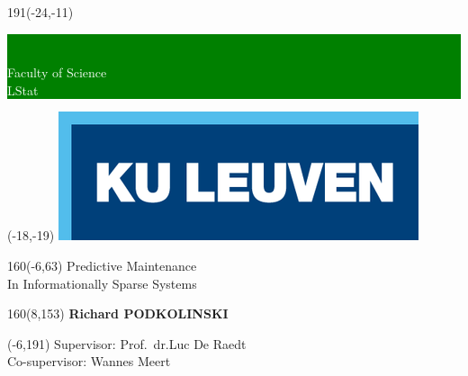 \documentclass[12pt,a4paper,oneside]{book}
\begin{document}
\thispagestyle{empty}
\newcommand{\form}[1]{\scalebox{1.087}{\boldmath{#1}}}
\sffamily
%
\begin{textblock}{191}(-24,-11)
\colorbox{green}{\hspace{139mm}\ \parbox[c][18truemm]{52mm}{\textcolor{white}{Faculty of Science \\ LStat}}}
\end{textblock}
%
\begin{textblock}{70}(-18,-19)
\textblockcolour{}
\includegraphics*[height=19.8truemm]{img/LogoKULeuven}
\end{textblock}
%
\begin{textblock}{160}(-6,63)
\textblockcolour{}
\vspace{-\parskip}
\flushleft
\fontsize{40}{42}\selectfont \textcolor{bluetitle}{Predictive Maintenance}\\[1.5mm]
\fontsize{20}{22}\selectfont In Informationally Sparse Systems
\end{textblock}
%
%
\begin{textblock}{160}(8,153)
\textblockcolour{}
\vspace{-\parskip}
\flushright
\fontsize{14}{16}\selectfont \textbf{Richard PODKOLINSKI}
\end{textblock}
%
\begin{textblock}{70}(-6,191)
\textblockcolour{}
\vspace{-\parskip}
\flushleft
Supervisor: Prof.~dr.Luc De Raedt\\[4.5pt]
Co-supervisor: Wannes Meert\\[4.5pt]
\end{textblock}
\end{document}

